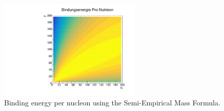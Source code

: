 \documentclass[12pt, letterpaper]{article}
\begin{document}
\begin{figure}[h!]
    \centering
    \includegraphics[width=0.6\textwidth]{figures/bindungsEnergie.pdf}
    \caption{Binding energy per nucleon using the Semi-Empirical Mass Formula. }
    \label{fig:my_label}
\end{figure}
\end{document}
